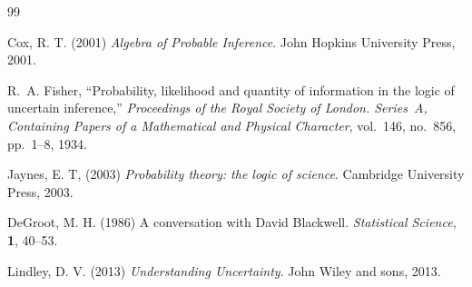 \documentclass{scrartcl}
\begin{document}
\begin{thebibliography}{99}

Cox, R. T. (2001)
       \textit{Algebra of Probable Inference}. John Hopkins University
       Press, 2001. 

R.~A. Fisher,
\newblock ``Probability, likelihood and quantity of information in the logic of
uncertain inference,''
\newblock \emph{Proceedings of the Royal Society of London. Series~A,
Containing Papers of a Mathematical and Physical Character}, vol.~146,
no.~856, pp.~1--8, 1934.

      Jaynes, E. T, (2003)
  \textit{Probability theory: the logic of science}. Cambridge
  University Press, 2003.


DeGroot, M. H. (1986)
       A conversation with David Blackwell.
\newblock \emph{Statistical Science}, \textbf{1}, 40--53.



Lindley, D. V. (2013)
       \textit{Understanding Uncertainty}. John Wiley and sons, 2013.


  \end{thebibliography}
\end{document}
